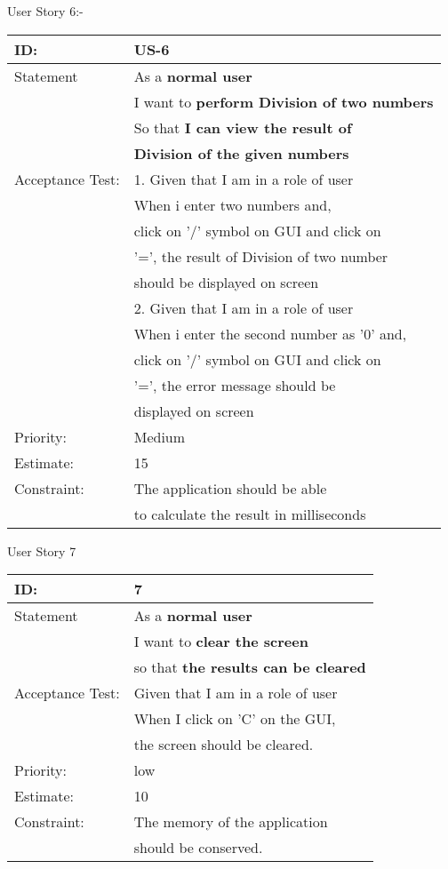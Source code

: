 \documentclass[12pt,a4paper]{article}
\begin{document}
\newpage
User Story 6:-
\begin{table}[h]
\centering
\begin{tabular}{|l|l|}
\hline
ID: & US-6 \\
\hline
Statement & As a \textbf{normal user} \\& I want to \textbf{perform Division of two numbers }  \\ &So that \textbf{I can view the result of }\\& \textbf{Division of the given numbers }\\
\hline
Acceptance Test: & 1. Given that I am in a role of user\\
& When i enter two numbers and,\\& click on '/' symbol on GUI and click on \\
& '=', the result of Division of two number \\& should be displayed on screen\\
& 2. Given that I am in a role of user\\
& When i enter the second number as '0' and,\\& click on '/' symbol on GUI and click on \\
& '=', the error message should be \\& displayed on screen\\
\hline
Priority: & Medium \\
\hline
Estimate: & 15\\
\hline
Constraint: & The application should be able  \\& to calculate the result in milliseconds\\
\hline
\end{tabular}
\end{table}
\newpage
User Story 7
\begin{table}[h]
\centering
\begin{tabular}{|l|l|}
\hline
ID: & 7 \\
\hline
Statement & As a \textbf{normal user} \\& I want to \textbf{clear the screen}\\
& so that \textbf{ the results can be cleared}\\
\hline
Acceptance Test: & Given that I am in a role of user\\
& When I click on 'C' on the GUI, \\& the screen should be cleared.\\
\hline
Priority: & low \\
\hline
Estimate: & 10\\
\hline
Constraint: & The memory of the application \\& should be conserved.\\
\hline
\end{tabular}
\end{table}
\end{document}

